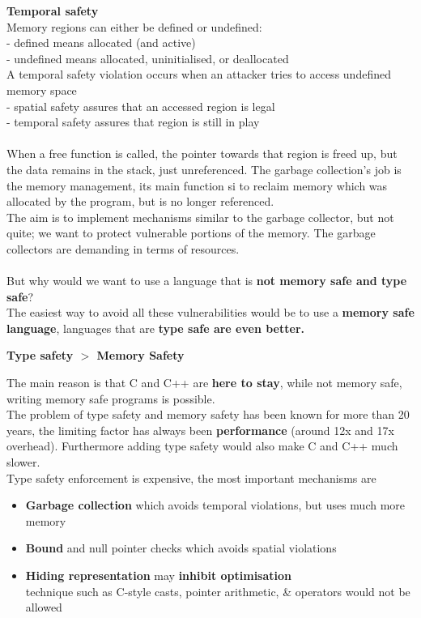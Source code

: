 \documentclass[11pt, oneside]{article}   	%
\begin{document}
\textbf{Temporal safety}\\
Memory regions can either be defined or undefined:\\
- defined means allocated (and active)\\
- undefined means allocated, uninitialised, or deallocated\\
A temporal safety violation occurs when an attacker tries to access undefined memory space\\ 
- spatial safety assures that an accessed region is legal\\
- temporal safety assures that region is still in play\\\\
When a free function is called, the pointer towards that region is freed up, but the data remains in the stack, just unreferenced. The garbage collection's job is the memory management, its main function si to reclaim memory which was allocated by the program, but is no longer referenced.\\
The aim is to implement mechanisms similar to the garbage collector, but not quite; we want to protect vulnerable portions of the memory. The garbage collectors are demanding in terms of resources.\\\\
But why would we want to use a language that is \textbf{not memory safe and type safe}?\\
The easiest way to avoid all these vulnerabilities would be to use a \textbf{memory safe language}, languages that are \textbf{type safe are even better.} 
\begin{center}
\textbf{Type safety  $>$ Memory Safety}
\end{center}
The main reason is that C and C++ are \textbf{here to stay}, while not memory safe, writing memory safe programs is possible.\\The problem of type safety and memory safety has been known for more than 20 years, the limiting factor has always been \textbf{performance}  (around 12x and 17x overhead). Furthermore adding type safety would also make C and C++ much slower. \\
Type safety enforcement is expensive, the most important mechanisms are 
\begin{itemize}
\item \textbf{Garbage collection} which avoids temporal violations, but uses much more memory
\item \textbf{Bound} and null pointer checks which avoids spatial violations
\item \textbf{Hiding representation} may \textbf{inhibit optimisation}\\
technique such as C-style casts, pointer arithmetic, \& operators would not be allowed
\end{itemize}
\end{document}
